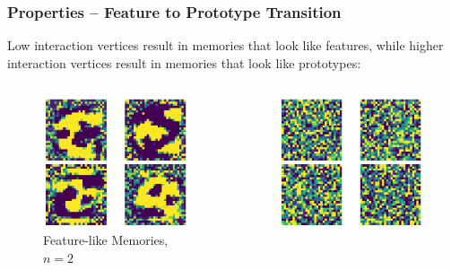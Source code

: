 \begin{frame}
    \frametitle{Properties -- Feature to Prototype Transition}

Low interaction vertices result in memories that look like features, while higher interaction vertices result in memories that look like prototypes:

\begin{columns}
    \begin{figure}
        \includegraphics[width=\textwidth]{images/featureDetector.png}
    \caption{Feature-like Memories, \(n=2\)}
    \end{figure}
    \pause
    \begin{figure}
    \includegraphics[width=\textwidth]{images/randomMemories/00.png}

\end{figure}
\end{columns}
\end{frame}

